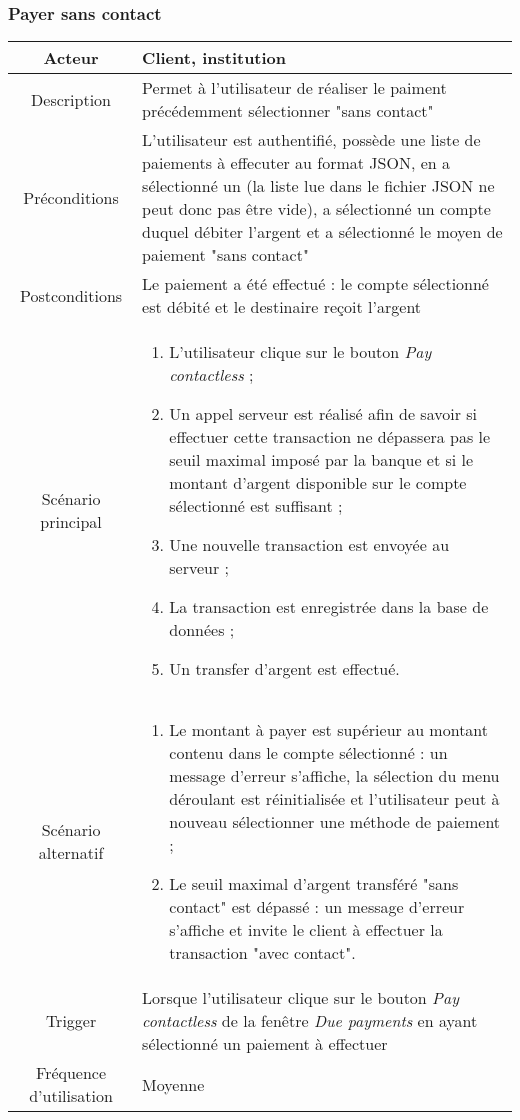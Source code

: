 \documentclass{article}
\begin{document}
\subsubsection{Payer sans contact}
\begin{table}[h!]

\begin{tabular}{|c|p{11cm}|}
\hline
Acteur & Client, institution \\
\hline
Description & Permet à l'utilisateur de réaliser le paiment précédemment sélectionner "sans contact" \\
\hline
Préconditions & L'utilisateur est authentifié, possède une liste de paiements à effecuter au format JSON, en a sélectionné un (la liste lue dans le fichier JSON ne peut donc pas être vide), a sélectionné un compte duquel débiter l'argent et a sélectionné le moyen de paiement "sans contact" \\
\hline
Postconditions & Le paiement a été effectué : le compte sélectionné est débité et le destinaire reçoit l'argent \\
\hline
Scénario principal & \begin{enumerate}
\item L'utilisateur clique sur le bouton \emph{Pay contactless} ;
\item Un appel serveur est réalisé afin de savoir si effectuer cette transaction ne dépassera pas le seuil maximal imposé par la banque et si le montant d'argent disponible sur le compte sélectionné est suffisant ;
\item Une nouvelle transaction est envoyée au serveur ;
\item La transaction est enregistrée dans la base de données ;
\item Un transfer d'argent est effectué.
\end{enumerate} \\
\hline
Scénario alternatif & \begin{enumerate}
\item Le montant à payer est supérieur au montant contenu dans le compte sélectionné : un message d'erreur s'affiche, la sélection du menu déroulant est réinitialisée et l'utilisateur peut à nouveau sélectionner une méthode de paiement ;
\item Le seuil maximal d'argent transféré "sans contact" est dépassé : un message d'erreur s'affiche et invite le client à effectuer la transaction "avec contact".
\end{enumerate} \\
\hline
Trigger & Lorsque l'utilisateur clique sur le bouton \emph{Pay contactless} de la fenêtre \emph{Due payments} en ayant sélectionné un paiement à effectuer \\
\hline
Fréquence d'utilisation & Moyenne \\
\hline
\end{tabular}

\end{table}
\end{document}
